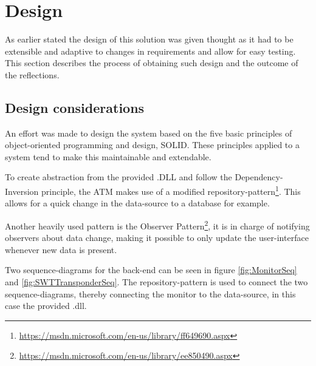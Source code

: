 \section{Design}
As earlier stated the design of this solution was given thought as it had to be extensible and adaptive to changes in requirements and allow for easy testing. This section describes the process of obtaining such design and the outcome of the reflections.

\subsection{Design considerations}
An effort was made to design the system based on the five basic principles of object-oriented programming and design, SOLID. These principles applied to a system tend to make this maintainable and extendable.

To create abstraction from the provided .DLL and follow the Dependency-Inversion principle, the ATM makes use of a modified repository-pattern\footnote{\url{https://msdn.microsoft.com/en-us/library/ff649690.aspx}}. This allows for a quick change in the data-source to a database for example.

Another heavily used pattern is the Observer Pattern\footnote{\url{https://msdn.microsoft.com/en-us/library/ee850490.aspx}}, it is in charge of notifying observers about data change, making it possible to only update the user-interface whenever new data is present.

Two sequence-diagrams for the back-end can be seen in figure \ref{fig:MonitorSeq} and \ref{fig:SWTTransponderSeq}. The repository-pattern is used to connect the two sequence-diagrams, thereby connecting the monitor to the data-source, in this case the provided .dll.

